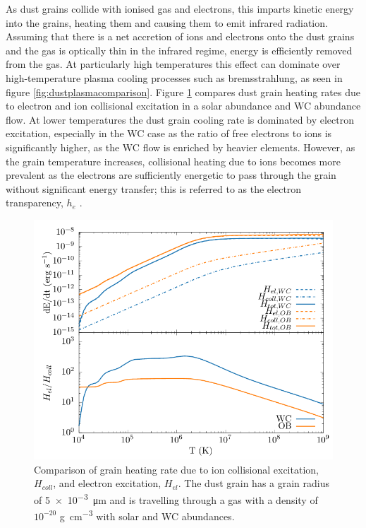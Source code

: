 As dust grains collide with ionised gas and electrons, this imparts kinetic energy into the grains, heating them and causing them to emit infrared radiation. Assuming that there is a net accretion of ions and electrons onto the dust grains and the gas is optically thin in the infrared regime, energy is efficiently removed from the gas.
At particularly high temperatures this effect can dominate over high-temperature plasma cooling processes such as bremsstrahlung, as seen in figure \ref{fig:dustplasmacomparison}.
Figure \ref{fig:collisionalheatingcomparison} compares dust grain heating rates due to electron and ion collisional excitation in a solar abundance and WC abundance flow.
At lower temperatures the dust grain cooling rate is dominated by electron excitation, especially in the WC case as the ratio of free electrons to ions is significantly higher, as the WC flow is enriched by heavier elements.
However, as the grain temperature increases, collisional heating due to ions becomes more prevalent as the electrons are sufficiently energetic to pass through the grain without significant energy transfer; this is referred to as the electron transparency, $h_e$ \parencite{dwek_infrared_1981}.

\begin{figure}[h]
  \centering
  \includegraphics{assets/dust-electron-contribution/coll-el-comp.pdf}
  \caption[$H_{el}$ and $H_{coll}$ comparison]{Comparison of grain heating rate due to ion collisional excitation, $H_{coll}$, and electron excitation, $H_{el}$. The dust grain has a grain radius of \SI{5e-3}{\micro\metre} and is travelling through a gas with a density of $10^{-20}$ \si{\gram\per\centi\metre\cubed} with solar and WC abundances.}
  \label{fig:collisionalheatingcomparison}
\end{figure}

